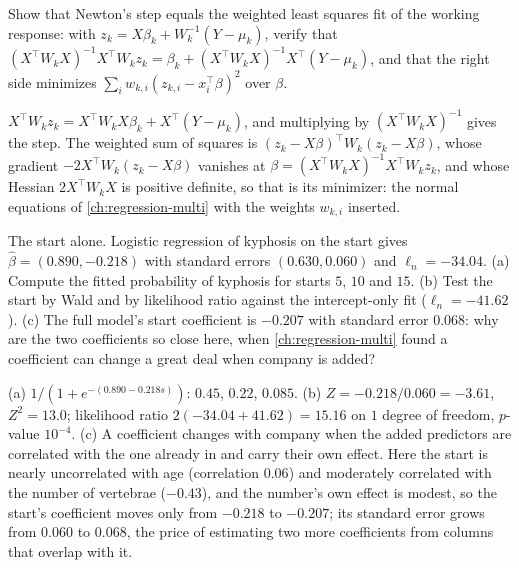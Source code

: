 \begin{exercise}
\label{ex:glm-irls}
Show that Newton's step equals the weighted least squares fit of the working response: with $z_k = X\beta_k + W_k^{-1}(Y - \mu_k)$, verify that $(X^\top W_kX)^{-1}X^\top W_kz_k = \beta_k + (X^\top W_kX)^{-1}X^\top(Y - \mu_k)$, and that the right side minimizes $\sum_i w_{k,i}(z_{k,i} - x_i^\top\beta)^2$ over $\beta$.
\end{exercise}
\begin{solution}
$X^\top W_kz_k = X^\top W_kX\beta_k + X^\top(Y - \mu_k)$, and multiplying by $(X^\top W_kX)^{-1}$ gives the step. The weighted sum of squares is $(z_k - X\beta)^\top W_k(z_k - X\beta)$, whose gradient $-2X^\top W_k(z_k - X\beta)$ vanishes at $\beta = (X^\top W_kX)^{-1}X^\top W_kz_k$, and whose Hessian $2X^\top W_kX$ is positive definite, so that is its minimizer: the normal equations of \cref{ch:regression-multi} with the weights $w_{k,i}$ inserted.
\end{solution}

\begin{exercise}
\label{ex:glm-kyphosis-start}
The start alone. Logistic regression of kyphosis on the start gives $\hat{\beta} = (0.890, -0.218)$ with standard errors $(0.630, 0.060)$ and $\ell_n = -34.04$. (a) Compute the fitted probability of kyphosis for starts $5$, $10$ and $15$. (b) Test the start by Wald and by likelihood ratio against the intercept-only fit ($\ell_n = -41.62$). (c) The full model's start coefficient is $-0.207$ with standard error $0.068$: why are the two coefficients so close here, when \cref{ch:regression-multi} found a coefficient can change a great deal when company is added?
\end{exercise}
\begin{solution}
(a) $1/(1 + e^{-(0.890 - 0.218s)})$: $0.45$, $0.22$, $0.085$. (b) $Z = -0.218/0.060 = -3.61$, $Z^2 = 13.0$; likelihood ratio $2(-34.04 + 41.62) = 15.16$ on $1$ degree of freedom, $p$-value $10^{-4}$. (c) A coefficient changes with company when the added predictors are correlated with the one already in and carry their own effect. Here the start is nearly uncorrelated with age (correlation $0.06$) and moderately correlated with the number of vertebrae ($-0.43$), and the number's own effect is modest, so the start's coefficient moves only from $-0.218$ to $-0.207$; its standard error grows from $0.060$ to $0.068$, the price of estimating two more coefficients from columns that overlap with it.
\end{solution}

